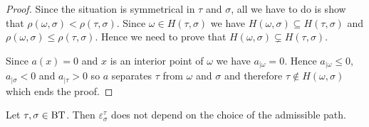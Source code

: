 \documentclass[a4paper,10pt]{amsart}
\begin{document}
\begin{proof}
Since the situation is symmetrical in $\tau$ and $\sigma$, all we have to do is show that $\rho(\omega,\sigma) < \rho(\tau,\sigma)$. Since $\omega \in H(\tau,\sigma)$ we have $H(\omega,\sigma) \subseteq H(\tau,\sigma)$ and $\rho(\omega,\sigma) \leq \rho(\tau,\sigma)$. Hence we need to prove that $H(\omega,\sigma) \varsubsetneq H(\tau,\sigma)$.


Since $a(x)=0$ and $x$ is an interior point of $\omega$ we have $a_{|\omega}=0$. Hence $a_{|\omega} \leq 0$, $a_{|\sigma} < 0$ and $a_{|\tau} > 0$ so $a$ separates $\tau$ from $\omega$ and $\sigma$ and therefore $\tau \notin H(\omega,\sigma)$ which ends the proof.
\end{proof}

\begin{Pro}
\label{proIndependanceChemin}
Let $\tau,\sigma \in \bt$. Then $\varepsilon_{\sigma}^{\tau}$ does not depend on the choice of the admissible path.
\end{Pro}
\end{document}
